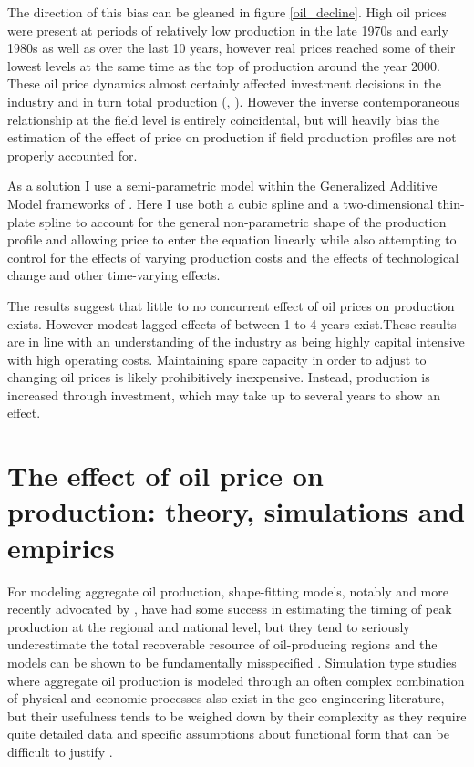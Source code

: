 \documentclass[11pt]{article}
\begin{document}
The direction of this bias can be gleaned in figure \ref{oil_decline}.  High oil prices were present at periods of relatively low production in the late 1970s and early 1980s as well as over the last 10 years, however real prices reached some of their lowest levels at the same time as the top of production around the year 2000. These oil price dynamics almost certainly affected investment decisions in the industry and in turn total production (\citep{osmundsen_is_2007}, \citep{aune_financial_2010}). However the inverse contemporaneous relationship at the field level is entirely coincidental, but will heavily bias the estimation of the effect of price on production if field production profiles are not properly accounted for. 



As a solution I use a semi-parametric model within the Generalized Additive Model frameworks of \cite{hastie_generalized_1990}.  Here I use both a cubic spline and a two-dimensional thin-plate spline to account for the general non-parametric shape of the production profile and allowing price to enter the equation linearly while also attempting to control for the effects of varying production costs and the effects of technological change and other time-varying effects.  

The results suggest that little to no concurrent effect of oil prices on production exists.  However modest lagged effects of between 1 to 4 years exist.These results are in line with an understanding of the industry as being highly capital intensive with high operating costs.  Maintaining spare capacity in order to adjust to changing oil prices is likely prohibitively inexpensive.  Instead, production is increased through investment, which may take up to several years to show an effect.

\section{The effect of oil price on production: theory, simulations and empirics}

For modeling aggregate oil production, shape-fitting models, notably \citet{hubbert_energy_1962} and more recently advocated by \citet{deffeyes_hubberts_2001}, have had some success in estimating the timing of peak production at the regional and national level, but they tend to seriously underestimate the total recoverable resource of oil-producing regions and the models can be shown to be fundamentally misspecified \citep{boyce_prediction_2013}.   Simulation type studies where aggregate oil production is modeled through an often complex combination of physical and economic processes also exist in the geo-engineering literature, but their usefulness tends to be weighed down by their complexity as they require quite detailed data and specific assumptions about functional form that can be difficult to justify \citep{brandt_review_2010}.
\end{document}
